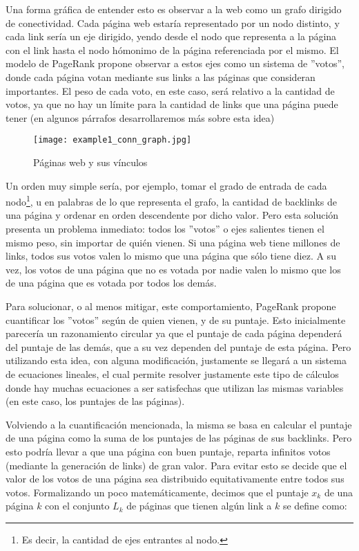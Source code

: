 \par Una forma gr\'afica de entender esto es observar a la web como un grafo
dirigido de conectividad. Cada p\'agina web estar\'ia representado por un nodo
distinto, y cada link ser\'ia un eje dirigido, yendo desde el nodo que
representa a la p\'agina con el link hasta el nodo h\'omonimo de la p\'agina
referenciada por el mismo. El modelo de PageRank propone observar a estos ejes
como un sistema de ''votos'', donde cada p\'agina votan mediante sus links a las
p\'aginas que consideran importantes. El peso de cada voto, en este caso, ser\'a
relativo a la cantidad de votos, ya que no hay un l\'imite para la cantidad de
links que una p\'agina puede tener (en algunos p\'arrafos desarrollaremos m\'as
sobre esta idea)

\begin{wrapfigure}[22]{l}{0.52\textwidth}
    \texttt{[image: example1\_conn\_graph.jpg]}
    \caption{P\'aginas web y sus v\'inculos}
\end{wrapfigure}
\noindent

\par Un orden muy simple ser\'ia, por ejemplo, tomar el grado de entrada de cada
nodo\footnote{Es decir, la cantidad de ejes entrantes al nodo.}, u en palabras
de lo que representa el grafo, la cantidad de backlinks de una p\'agina y
ordenar en orden descendente por dicho valor. Pero esta soluci\'on presenta
un problema inmediato: todos los ''votos'' o ejes salientes tienen el mismo
peso, sin importar de qui\'en vienen. Si una p\'agina web tiene millones de
links, todos sus votos valen lo mismo que una p\'agina que s\'olo tiene diez. A
su vez, los votos de una p\'agina que no es votada por nadie valen lo mismo que
los de una p\'agina que es votada por todos los dem\'as.

\par Para solucionar, o al menos mitigar, este comportamiento, PageRank propone
cuantificar los ''votos'' seg\'un de quien vienen, y de su puntaje. Esto
inicialmente parecer\'ia un razonamiento circular ya que el puntaje de cada
p\'agina depender\'a del puntaje de las dem\'as, que a su vez dependen del
puntaje de esta p\'agina. Pero utilizando esta idea, con alguna modificaci\'on,
justamente se llegar\'a a un sistema de ecuaciones lineales, el cual permite
resolver justamente este tipo de c\'alculos donde hay muchas ecuaciones a ser
satisfechas que utilizan las mismas variables (en este caso, los puntajes de las
p\'aginas).

\par Volviendo a la cuantificaci\'on mencionada, la misma se basa en calcular el
puntaje de una p\'agina como la suma de los puntajes de las p\'aginas de sus
backlinks. Pero esto podr\'ia llevar a que una p\'agina con buen puntaje,
reparta infinitos votos (mediante la generaci\'on de links) de gran valor. Para
evitar esto se decide que el valor de los votos de una p\'agina sea distribuido
equitativamente entre todos sus votos. Formalizando un poco matem\'aticamente,
decimos que el puntaje $x_k$ de una p\'agina $k$ con el conjunto $L_k$ de
p\'aginas que tienen alg\'un link a $k$ se define como:

